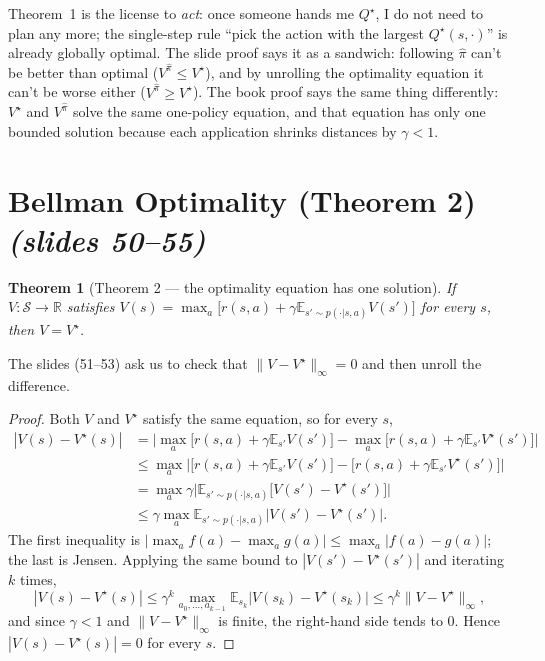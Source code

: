 \documentclass[11pt,a4paper]{article}
\newcommand{\E}{\mathbb{E}}
\newcommand{\cS}{\mathcal{S}}
\newcommand{\slr}[1]{\texorpdfstring{\emph{(slides #1)}}{(slides #1)}}
\theoremstyle{plain}
\newtheorem{theorem}{Theorem}[section]
\theoremstyle{definition}
\theoremstyle{remark}
\begin{document}
\begin{intuition}
Theorem~1 is the license to \emph{act}: once someone hands me $Q^\star$, I do not need to plan any more; the single-step rule ``pick the action with the largest $Q^\star(s,\cdot)$'' is already globally optimal. The slide proof says it as a sandwich: following $\hat\pi$ can't be better than optimal ($V^{\hat\pi}\le V^\star$), and by unrolling the optimality equation it can't be worse either ($V^{\hat\pi}\ge V^\star$). The book proof says the same thing differently: $V^\star$ and $V^{\hat\pi}$ solve the same one-policy equation, and that equation has only one bounded solution because each application shrinks distances by $\gamma<1$.
\end{intuition}

\section{Bellman Optimality (Theorem 2) \slr{50--55}}
\begin{theorem}[Theorem 2 --- the optimality equation has one solution]\label{thm:unique}
If $V:\cS\to\mathbb R$ satisfies $V(s)=\max_a\big[r(s,a)+\gamma\E_{s'\sim p(\cdot|s,a)}V(s')\big]$ for every $s$, then $V=V^\star$.
\end{theorem}
The slides (51--53) ask us to check that $\|V-V^\star\|_\infty=0$ and then unroll the difference.
\begin{proof}
Both $V$ and $V^\star$ satisfy the same equation, so for every $s$,
\begin{align*}
|V(s)-V^\star(s)|&=\Big|\max_a\big[r(s,a)+\gamma\E_{s'}V(s')\big]-\max_a\big[r(s,a)+\gamma\E_{s'}V^\star(s')\big]\Big|\\
&\le\max_a\Big|\big[r(s,a)+\gamma\E_{s'}V(s')\big]-\big[r(s,a)+\gamma\E_{s'}V^\star(s')\big]\Big|\\
&=\max_a\gamma\Big|\E_{s'\sim p(\cdot|s,a)}\big[V(s')-V^\star(s')\big]\Big|\\
&\le\gamma\max_a\E_{s'\sim p(\cdot|s,a)}\big|V(s')-V^\star(s')\big|.
\end{align*}
The first inequality is $|\max_af(a)-\max_ag(a)|\le\max_a|f(a)-g(a)|$; the last is Jensen. Applying the same bound to $|V(s')-V^\star(s')|$ and iterating $k$ times,
\[
|V(s)-V^\star(s)|\le\gamma^k\max_{a_0,\dots,a_{k-1}}\E_{s_k}\big|V(s_k)-V^\star(s_k)\big|\le\gamma^k\|V-V^\star\|_\infty,
\]
and since $\gamma<1$ and $\|V-V^\star\|_\infty$ is finite, the right-hand side tends to $0$. Hence $|V(s)-V^\star(s)|=0$ for every $s$.
\end{proof}
\end{document}
